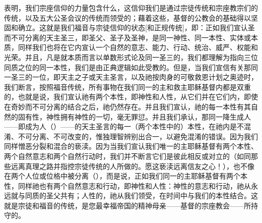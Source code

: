 表明，我们宗座信仰的力量包含什么，这信仰我们是通过宗徒传统和宗座教宗们的传统，以及五大公圣会议的传统而领受的；藉着这些，基督的公教会的基础得以坚固和确立。这就是我们福音与宗徒信仰的状态[和正规传统]，即：正如我们宣认圣而不可分离的天主圣三，即圣父、圣子及圣神，是同一神性、同一本性、实体或本质，同样我们也将在它内宣认一个自然的意志、能力、行动、统治、威严、权能和光荣。并且，凡是就本质而言以单数形式论及同一圣三的，我们都理解为指向三位同质之位的同一本性，我们是由正典逻辑如此受教的。但是，当我们宣信有关那同一圣三的一位，即天主之子或天主圣言，以及祂按肉身的可敬救恩计划之奥迹时，我们断言，按照福音传统，所有事物在我们同一的主和救主耶稣基督内都是双重的，也就是说，我们宣认祂有两个本性，即神性和人性，从它们并在它们内，即使在奇妙而不可分离的结合之后，祂仍然存在。并且我们宣认，祂的每一本性有其自然的固有性，神性拥有神性的一切，毫无罪愆。并且我们承认，那同一降生成人——即成为人（）——的天主圣言的每一（两个本性中的）本性，在祂内是不混淆、不可分离、不可改变的，惟独理智辨别出合一，以避免混淆的错误。因为我们同样憎恶分裂和混合的亵渎。因为当我们宣认我们唯一的主耶稣基督有两个本性、两个自然意志和两个自然行动时，我们并不断言它们是彼此相反或对立的（如同那些远离真理之路并指控宗徒传统的人所做的。愿这亵渎远离信友之心！），也不像在两个人位或位格中被分离（），而是说，正如我们同一的主耶稣基督有两个本性，同样祂也有两个自然意志和行动，即神性和人性：神性的意志和行动，祂从永远就与同质的圣父共有；人性的，祂从我们领受，在时间中与我们的本性结合。这就是宗徒和福音的传统，是您最幸福帝国的精神母亲——基督的宗座教会——所持守的。\par

